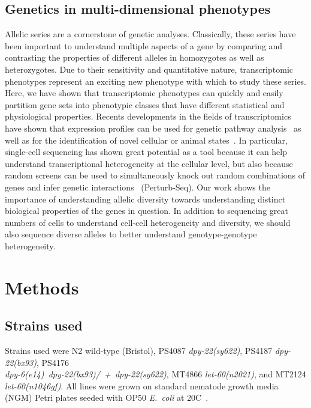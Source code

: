 \documentclass[10pt, onecolumn]{article}
\newcommand{\ecol}{\emph{E.~coli}}
\newcommand{\gene}[1]{\mbox{\emph{#1}}}
\begin{document}
\subsection*{Genetics in multi-dimensional phenotypes}
Allelic series are a cornerstone of genetic analyses. Classically, these series
have been important to understand multiple aspects of a gene by comparing and
contrasting the properties of different alleles in homozygotes as well as
heterozygotes. Due to their sensitivity and quantitative nature, transcriptomic
phenotypes represent an exciting new phenotype with which to study these series.
Here, we have shown that transcriptomic phenotypes can quickly and easily
partition gene sets into phenotypic classes that have different statistical and
physiological properties. Recents developments in the fields of transcriptomics
have shown that expression profiles can be used for genetic pathway
analysis~\cite{} as well as for the identification of novel cellular or animal
states~\cite{}. In particular, single-cell sequencing has shown great
potential as a tool because it can help understand transcriptional heterogeneity
at the cellular level, but also because random screens can be used to
simultaneously knock out random combinations of genes and infer genetic
interactions~\cite{} (Perturb-Seq). Our work shows the importance of
understanding allelic diversity towards understanding distinct biological
properties of the genes in question. In addition to sequencing great numbers of
cells to understand cell-cell heterogeneity and diversity, we should also
sequence diverse alleles to better understand genotype-genotype
heterogeneity.

\section*{Methods}
\subsection*{Strains used}
Strains used were N2 wild-type (Bristol),
PS4087 \gene{dpy-22(sy622)},
PS4187 \gene{dpy-22(bx93)},
PS4176\\ \gene{dpy-6(e14) dpy-22(bx93)/ + dpy-22(sy622)},
MT4866 \gene{let-60(n2021)}, and
MT2124 \gene{let-60(n1046gf)}.
All lines were grown on standard nematode growth media (NGM) Petri plates seeded
with OP50 \ecol{} at 20\degree{}C~\cite{Brenner1974}.
\end{document}
